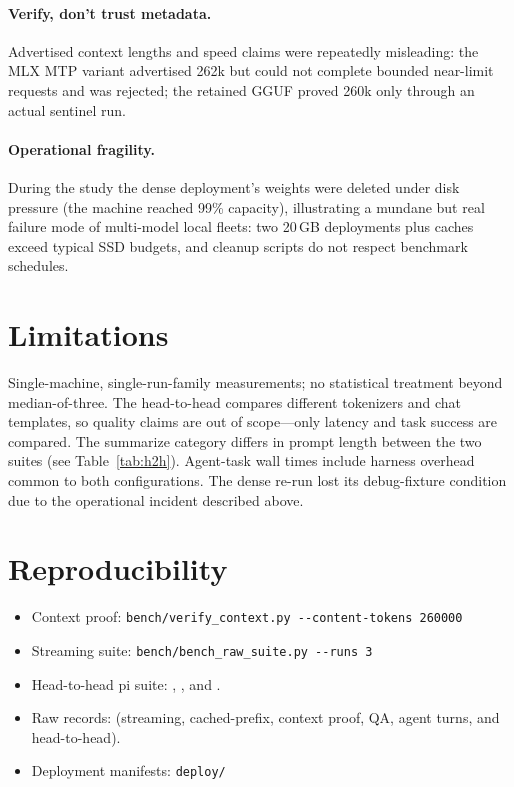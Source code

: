 \documentclass[11pt]{article}
\begin{document}
\paragraph{Verify, don't trust metadata.} Advertised context lengths and
speed claims were repeatedly misleading: the MLX MTP variant advertised 262k
but could not complete bounded near-limit requests and was rejected; the
retained GGUF proved 260k only through an actual sentinel run.

\paragraph{Operational fragility.} During the study the dense deployment's
weights were deleted under disk pressure (the machine reached 99\%
capacity), illustrating a mundane but real failure mode of
multi-model local fleets: two 20\,GB deployments plus caches exceed typical
SSD budgets, and cleanup scripts do not respect benchmark schedules.

\section{Limitations}
Single-machine, single-run-family measurements; no statistical treatment beyond
median-of-three. The head-to-head compares different tokenizers and chat
templates, so quality claims are out of scope---only latency and task success
are compared. The summarize category differs in prompt length between the two
suites (see Table~\ref{tab:h2h}). Agent-task wall times include harness
overhead common to both configurations. The dense re-run lost its debug-fixture
condition due to the operational incident described above.

\section{Reproducibility}

\begin{itemize}
\item Context proof: \texttt{bench/verify\_context.py -{}-content-tokens 260000}
\item Streaming suite: \texttt{bench/bench\_raw\_suite.py -{}-runs 3}
\item Head-to-head pi suite: ,
      , and .
\item Raw records:  (streaming, cached-prefix,
      context proof, QA, agent turns, and head-to-head).
\item Deployment manifests: \texttt{deploy/}
\end{itemize}
\end{document}
